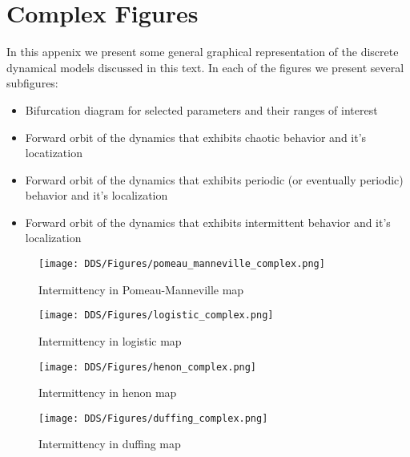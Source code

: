 \chapter{Complex Figures}
\label{sec:Appendix_complex_figures}
In this appenix we present some general graphical representation of the discrete dynamical models discussed in this text.
In each of the figures we present several subfigures:
\begin{itemize}
  \item Bifurcation diagram for selected parameters and their ranges of interest
  \item Forward orbit of the dynamics that exhibits chaotic behavior and it's locatization
  \item Forward orbit of the dynamics that exhibits periodic (or eventually periodic) behavior and it's localization
  \item Forward orbit of the dynamics that exhibits intermittent behavior and it's localization
\end{itemize}

\begin{figure}[!ht]
	\centering
	\texttt{[image: DDS/Figures/pomeau\_manneville\_complex.png]}
	\caption{Intermittency in Pomeau-Manneville map}
	\label{fig:complex_pomeau_manneville}
\end{figure}

\begin{figure}[!ht]
	\centering
	\texttt{[image: DDS/Figures/logistic\_complex.png]}
	\caption{Intermittency in logistic map}
	\label{fig:complex_logistic}
\end{figure}

\begin{figure}[!ht]
	\centering
	\texttt{[image: DDS/Figures/henon\_complex.png]}
	\caption{Intermittency in henon map}
	\label{fig:complex_henon}
\end{figure}

\begin{figure}[!ht]
	\centering
	\texttt{[image: DDS/Figures/duffing\_complex.png]}
	\caption{Intermittency in duffing map}
	\label{fig:complex_duffing}
\end{figure}

\endinput